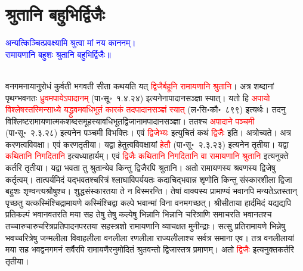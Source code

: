 \section[श्रुतानि बहुभिर्द्विजैः]{श्रुतानि बहुभिर्द्विजैः}
\centering\textcolor{blue}{अन्यत्किञ्चित्प्रवक्ष्यामि श्रुत्वा मां नय काननम्।\nopagebreak\\
रामायणानि बहुशः श्रुतानि बहुभिर्द्विजैः॥}\nopagebreak\\
\\
\begin{sloppypar}\justifying\noindent\hspace{10mm} वन\-गमनायानुरोधं कुर्वती भगवती सीता कथयति यत् \textcolor{red}{द्विजैर्बहूनि रामायणानि श्रुतानि}। अत्र शब्दानां पृथग्भवनतः \textcolor{red}{ध्रुवमपायेऽपादानम्‌} (पा॰सू॰~१.४.२४) इत्यनेनापादान\-सञ्ज्ञा स्यात्। यतो हि \textcolor{red}{अपायो विश्लेषस्तस्मिन्साध्ये यद्ध्रुवमवधि\-भूतं कारकं तदपादान\-सञ्ज्ञं स्यात्‌} (ल॰सि॰कौ॰~८९९) इत्यर्थः। तदनु विश्लिष्ट\-रामायणात्मक\-शब्द\-समूहस्यावधिभूत\-द्विजानामपादान\-सञ्ज्ञा। ततश्च \textcolor{red}{अपादाने पञ्चमी} (पा॰सू॰~२.३.२८) इत्यनेन पञ्चमी विभक्तिः। एवं \textcolor{red}{द्विजेभ्यः} इत्युचितं कथं \textcolor{red}{द्विजैः} इति। अत्रोच्यते। अत्र करणत्व\-विवक्षा। एवं करण\-तृतीया। यद्वा हेतुत्व\-विवक्षायां \textcolor{red}{हेतौ} (पा॰सू॰~२.३.२३) इत्यनेन तृतीया। यद्वा \textcolor{red}{कथितानि निगदितानि} इत्यध्याहार्यम्। एवं \textcolor{red}{द्विजैः कथितानि निगदितानि वा रामायणानि श्रुतानि} इत्यनुक्ते कर्तरि तृतीया। यद्वा भवता तु श्रुतान्येव किन्तु द्विजैरपि श्रुतानि। अतो रामायणस्य श्रवणस्य द्विजेषु कर्तृत्वम्। तात्पर्यमिदं यद्भवतश्चरित्रं श्लाघा\-विपर्ययतः कदाचिद्भवान्न शृणोति किन्तु संस्कार\-शीला द्विजा बहुशः शृण्वन्त्यश्रौषुश्च। शुद्ध\-संस्कारतया ते न विस्मरन्ति। तेषां वाक्यस्य प्रामाण्यं भवानपि मन्यतेऽतस्तान् पृच्छतु यत्कस्मिंश्चिद्रामायणे कस्मिंश्चिद्वा कल्पे भवान्मां विना वनमगच्छत्। श्रीसीताया हार्दमिदं यद्यद्यपि प्रतिकल्पं भवानवतरति मया सह तेषु तेषु कल्पेषु भिन्नानि भिन्नानि चरित्राणि समाचरति भवानतश्च तच्चारु\-चारु\-चरित्र\-प्रतिपादन\-परतया सहस्त्रशो रामायणानि व्याचक्षत मुनीन्द्राः। सत्सु प्रति\-रामायणे भिन्नेषु भवच्चरित्रेषु जन्म\-लीला विवाह\-लीला वन\-लीला रण\-लीला राज्य\-लीलाश्च सर्वत्र समाना एव। तत्र वन\-लीलायां मया सह भवद्वन\-गमनं सर्वैरपि रामायणैरनु\-मोदितं श्रुतवन्तो द्विजास्तत्र प्रमाणम्। अतो \textcolor{red}{द्विजैः} इत्यनुक्त\-कर्तरि तृतीया।\end{sloppypar}
